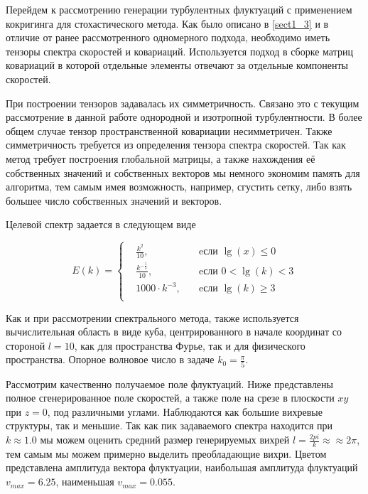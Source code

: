 Перейдем к рассмотрению генерации турбулентных флуктуаций с применением кокригинга для стохастического метода. Как было описано в \ref{sect1_3} и в отличие от ранее рассмотренного одномерного подхода, необходимо иметь тензоры спектра скоростей и ковариаций. Используется подход в сборке матриц ковариаций в которой отдельные элементы отвечают за отдельные компоненты скоростей.

При построении тензоров задавалась их симметричность. Связано это с текущим рассмотрение в данной работе однородной и изотропной турбулентности. В более общем случае тензор пространственной ковариации несимметричен. Также симметричность требуется из определения тензора спектра скоростей. Так как метод требует построения глобальной матрицы, а также нахождения её собственных значений и собственных векторов мы немного экономим память для алгоритма, тем самым имея возможность, например, сгустить сетку, либо взять большее число собственных значений и векторов.

Целевой спектр задается в следующем виде

\[
    E(k) = \left\{
    \begin{alignedat}{2}
        &\frac{k^2}{10}, \quad &\text{eсли } \lg(x) \leqslant 0 \\
        &\frac{k^{-\frac{5}{3}}}{10}, \quad & \text{eсли } 0 < \lg(k) < 3 \\
        &1000 \cdot k^{-3}, \quad &\text{eсли } \lg(k) \geqslant 3 \\
    \end{alignedat}
    \right.
\]

Как и при рассмотрении спектрального метода, также используется вычислительная область в виде куба, центрированного в начале координат со стороной $l=10$, как для пространства Фурье, так и для физического пространства. Опорное волновое число в задаче $k_0=\frac{\pi}{5}$.  

Рассмотрим качественно получаемое поле флуктуаций. Ниже представлены полное сгенерированное поле скоростей, а также поле на срезе в плоскости $xy$ при $z = 0$, под различными углами. Наблюдаются как большие вихревые структуры, так и меньшие. Так как пик задаваемого спектра находится при $k \approx 1.0$ мы можем оценить средний размер генерируемых вихрей $ l = \frac{2 pi}{k} \approx \approx 2 \pi$, тем самым мы можем примерно выделить преобладающие вихри. Цветом представлена амплитуда вектора флуктуации, наибольшая амплитуда флуктуаций $v_{max} = 6.25$, наименьшая $v_{max} = 0.055$.  

